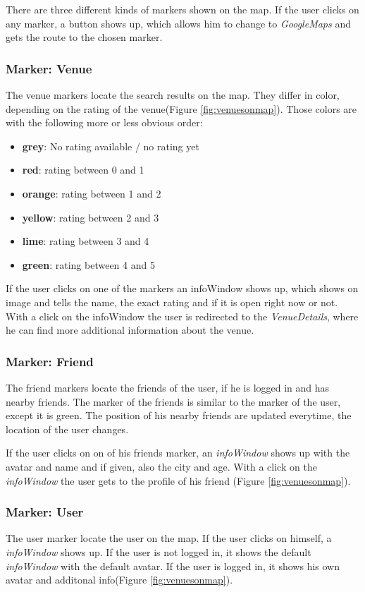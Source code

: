There are three different kinds of markers shown on the map. If the user clicks on any marker, a button shows up, which allows him to change to \textit{GoogleMaps} and gets the route to the chosen marker. 

\subsubsection{Marker: Venue} 
The venue markers locate the search results on the map. They differ in color, depending on the rating of the venue(Figure \ref{fig:venuesonmap}). Those colors are with the following more or less obvious order:

\begin{itemize}
\item \textbf{grey}: No rating available / no rating yet
\item \textbf{red}: rating between 0 and 1
\item \textbf{orange}: rating between 1 and 2
\item \textbf{yellow}: rating between 2 and 3
\item \textbf{lime}: rating between 3 and 4
\item \textbf{green}: rating between 4 and 5
\end{itemize}

If the user clicks on one of the markers an infoWindow shows up, which shows on image and tells the name, the exact rating and if it is open right now or not. With a click on the infoWindow the user is redirected to the \textit{VenueDetails}, where he can find more additional information about the venue.

\subsubsection{Marker: Friend}
The friend markers locate the friends of the user, if he is logged in and has nearby friends. The marker of the friends is similar to the marker of the user, except it is green.
The position of his nearby friends are updated everytime, the location of the user changes. 

If the user clicks on on of his friends marker, an \textit{infoWindow} shows up with the avatar and name and if given, also the city and age. With a click on the \textit{infoWindow} the user gets to the profile of his friend (Figure \ref{fig:venuesonmap}).

\subsubsection{Marker: User}
The user marker locate the user on the map. If the user clicks on himself, a \textit{infoWindow} shows up. If the user is not logged in, it shows the default \textit{infoWindow} with the default avatar. If the user is logged in, it shows his own avatar and additonal info(Figure \ref{fig:venuesonmap}). 

